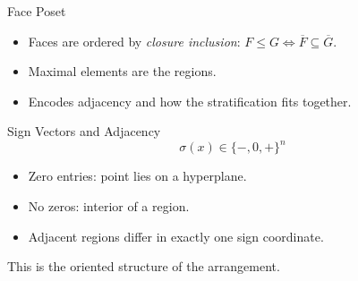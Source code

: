 \documentclass{beamer}
\begin{document}
\begin{frame}{Face Poset}

\begin{center}
\end{center}

\begin{itemize}
  \item Faces are ordered by \emph{closure inclusion}:  
        $F \le G \iff \overline{F} \subseteq \overline{G}$.
  \item Maximal elements are the regions.
  \item Encodes adjacency and how the stratification fits together.
\end{itemize}

\end{frame}

\begin{frame}{Sign Vectors and Adjacency}
\[
\sigma(x)\in\{-,0,+\}^n
\]

\begin{itemize}
  \item Zero entries: point lies on a hyperplane.
  \item No zeros: interior of a region.
  \item Adjacent regions differ in exactly one sign coordinate.
\end{itemize}

\pause

This is the oriented structure of the arrangement.
\end{frame}
\end{document}
